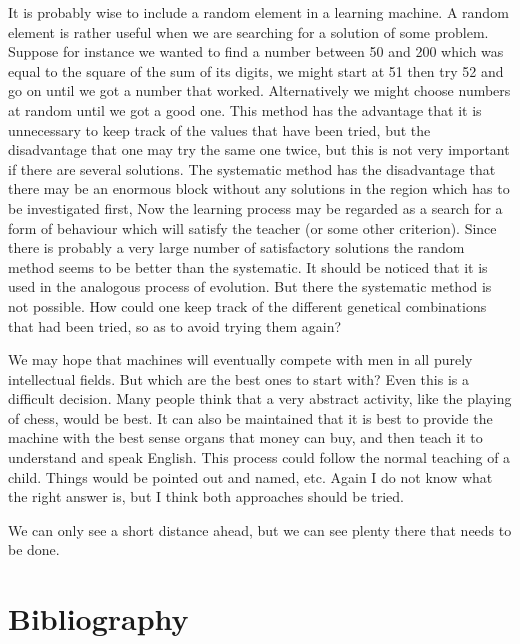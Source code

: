 \documentclass[10pt,twoside,openright]{memoir}
\begin{document}
It is probably wise to include a random element in a learning machine. A random element is rather useful when we are searching for a solution of some problem. Suppose for instance we wanted to find a number between 50 and 200 which was equal to the square of the sum of its digits, we might start at 51 then try 52 and go on until we got a number that worked. Alternatively we might choose numbers at random until we got a good one. This method has the advantage that it is unnecessary to keep track of the values that have been tried, but the disadvantage that one may try the same one twice, but this is not very important if there are several solutions. The systematic method has the disadvantage that there may be an enormous block without any solutions in the region which has to be investigated first, Now the learning process may be regarded as a search for a form of behaviour which will satisfy the teacher (or some other criterion). Since there is probably a very large number of satisfactory solutions the random method seems to be better than the systematic. It should be noticed that it is used in the analogous process of evolution. But there the systematic method is not possible. How could one keep track of the different genetical combinations that had been tried, so as to avoid trying them again?

We may hope that machines will eventually compete with men in all purely intellectual fields. But which are the best ones to start with? Even this is a difficult decision. Many people think that a very abstract activity, like the playing of chess, would be best. It can also be maintained that it is best to provide the machine with the best sense organs that money can buy, and then teach it to understand and speak English. This process could follow the normal teaching of a child. Things would be pointed out and named, etc. Again I do not know what the right answer is, but I think both approaches should be tried.

We can only see a short distance ahead, but we can see plenty there that needs to be done.

\section{Bibliography}
\end{document}
